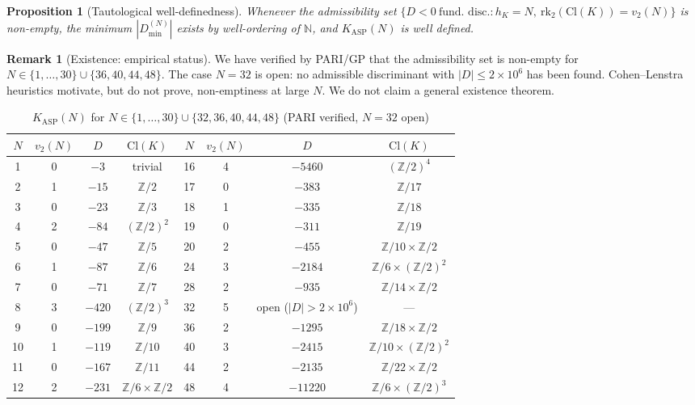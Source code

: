 \documentclass[11pt]{article}
\newtheorem{proposition}{Proposition}
\theoremstyle{definition}
\newtheorem{remark}{Remark}
\begin{document}
\begin{proposition}[Tautological well-definedness]
Whenever the admissibility set $\{D < 0\ \text{fund.\ disc.}: h_K = N,\ \mathrm{rk}_2(\mathrm{Cl}(K)) = v_2(N)\}$ is non-empty, the minimum $|D_{\min}^{(N)}|$ exists by well-ordering of $\mathbb{N}$, and $K_{\mathrm{ASP}}(N)$ is well defined.
\end{proposition}

\begin{remark}[Existence: empirical status]\label{rem:existence}
We have verified by PARI/GP that the admissibility set is non-empty for $N \in \{1,\dots,30\} \cup \{36, 40, 44, 48\}$. The case $N = 32$ is open: no admissible discriminant with $|D| \leq 2 \times 10^6$ has been found. Cohen--Lenstra heuristics \cite{CohenLenstra1984} motivate, but do not prove, non-emptiness at large $N$. We do not claim a general existence theorem.
\end{remark}

\begin{table}[h]
\centering
\caption{$K_{\mathrm{ASP}}(N)$ for $N \in \{1,\ldots,30\}\cup\{32, 36, 40, 44, 48\}$ (PARI verified, $N=32$ open)}
\label{tab:dict}
\begin{tabular}{cccc|cccc}
$N$ & $v_2(N)$ & $D$ & $\mathrm{Cl}(K)$ & $N$ & $v_2(N)$ & $D$ & $\mathrm{Cl}(K)$ \\
\hline
1 & 0 & $-3$ & trivial & 16 & 4 & $-5460$ & $(\mathbb{Z}/2)^4$ \\
2 & 1 & $-15$ & $\mathbb{Z}/2$ & 17 & 0 & $-383$ & $\mathbb{Z}/17$ \\
3 & 0 & $-23$ & $\mathbb{Z}/3$ & 18 & 1 & $-335$ & $\mathbb{Z}/18$ \\
4 & 2 & $-84$ & $(\mathbb{Z}/2)^2$ & 19 & 0 & $-311$ & $\mathbb{Z}/19$ \\
5 & 0 & $-47$ & $\mathbb{Z}/5$ & 20 & 2 & $-455$ & $\mathbb{Z}/10\times\mathbb{Z}/2$ \\
6 & 1 & $-87$ & $\mathbb{Z}/6$ & 24 & 3 & $-2184$ & $\mathbb{Z}/6\times(\mathbb{Z}/2)^2$ \\
7 & 0 & $-71$ & $\mathbb{Z}/7$ & 28 & 2 & $-935$ & $\mathbb{Z}/14\times\mathbb{Z}/2$ \\
8 & 3 & $-420$ & $(\mathbb{Z}/2)^3$ & 32 & 5 & open ($|D|>2\!\times\!10^6$) & --- \\
9 & 0 & $-199$ & $\mathbb{Z}/9$ & 36 & 2 & $-1295$ & $\mathbb{Z}/18\times\mathbb{Z}/2$ \\
10 & 1 & $-119$ & $\mathbb{Z}/10$ & 40 & 3 & $-2415$ & $\mathbb{Z}/10\times(\mathbb{Z}/2)^2$ \\
11 & 0 & $-167$ & $\mathbb{Z}/11$ & 44 & 2 & $-2135$ & $\mathbb{Z}/22\times\mathbb{Z}/2$ \\
12 & 2 & $-231$ & $\mathbb{Z}/6\times\mathbb{Z}/2$ & 48 & 4 & $-11220$ & $\mathbb{Z}/6\times(\mathbb{Z}/2)^3$ \\
\end{tabular}
\end{table}
\end{document}
